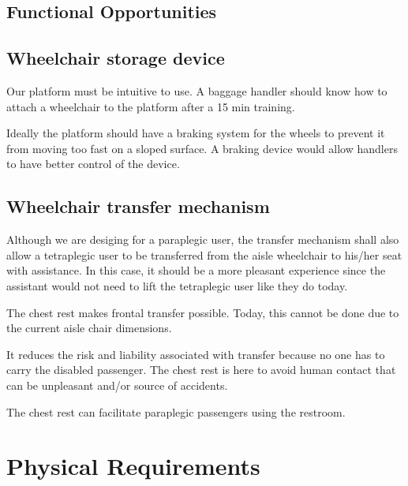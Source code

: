 \subsection{Functional Opportunities}

\subsection*{Wheelchair storage device}

\begin{list}{-}{}
  \item Our platform must be intuitive to use. A baggage handler should know how to attach a wheelchair to the platform after a 15 min training.
  \item Ideally the platform should have a braking system for the wheels to prevent it from moving too fast on a sloped surface. A braking device would allow handlers to have better control of the device.
\end{list}

\subsection*{Wheelchair transfer mechanism}

\begin{list}{-}{}
  \item Although we are desiging for a paraplegic user, the transfer mechanism shall also allow a tetraplegic user to be transferred from the aisle wheelchair to his/her seat with assistance. In this case, it should be a more pleasant experience since the assistant would not need to lift the tetraplegic user like they do today.
  \item The chest rest makes frontal transfer possible. Today, this cannot be done due to the current aisle chair dimensions.
  \item It reduces the risk and liability associated with transfer because no one has to carry the disabled passenger. The chest rest is here to avoid human contact that can be unpleasant and/or source of accidents.
  \item The chest rest can facilitate paraplegic passengers using the restroom.
\end{list}


\section{Physical Requirements}

